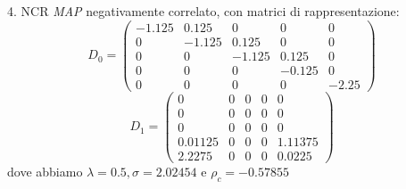 \documentclass{beamer}
\begin{document}
\begin{frame}
    \frametitle{}
    \begin{block}{4. NCR}
        \emph{MAP} negativamente correlato, con matrici di rappresentazione:
        \small{\begin{equation*}
            D_0 =
            \begin{pmatrix}
                -1.125 & 0.125 & 0 & 0 & 0 \\
                0 & -1.125 & 0.125 & 0 & 0 \\
                0 & 0 & -1.125 & 0.125 & 0 \\
                0 & 0 & 0 & -0.125 & 0 \\
                0 & 0 & 0 & 0 & -2.25
            \end{pmatrix}
        \end{equation*}
        \begin{equation*}
            D_1 =
            \begin{pmatrix}
                0 & 0 & 0 & 0 & 0 \\
                0 & 0 & 0 & 0 & 0 \\
                0 & 0 & 0 & 0 & 0 \\
                0.01125 & 0 & 0 & 0 & 1.11375 \\
                2.2275 & 0 & 0 & 0 & 0.0225
            \end{pmatrix}
        \end{equation*}}
        dove abbiamo $\lambda = 0.5, \sigma = 2.02454$ e $\rho_c =  -0.57855$
    \end{block}
\end{frame}
\end{document}
